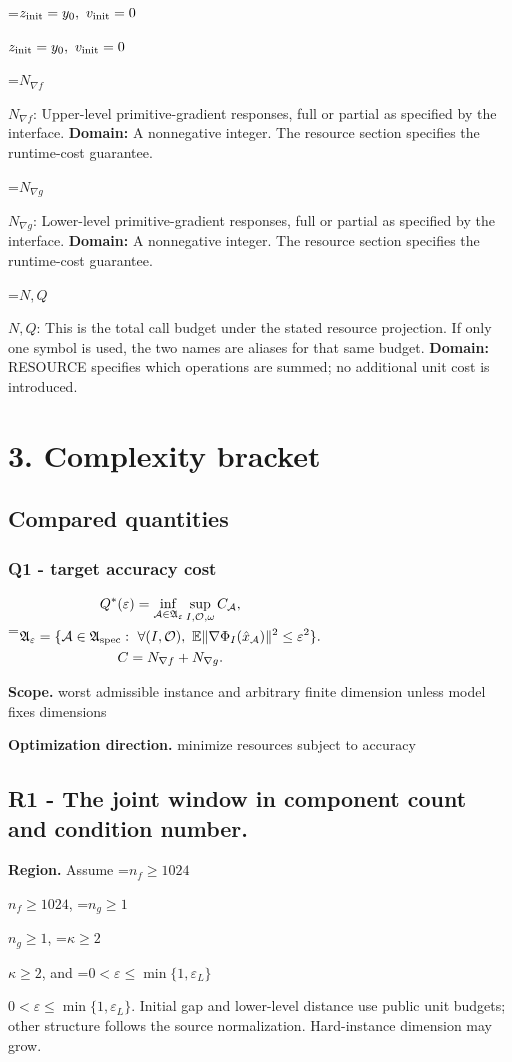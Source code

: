 \documentclass[10pt,a4paper]{article}
\newcommand{\AtlasMath}[1]{\par\begingroup\centering\setbox0=\hbox{$\displaystyle #1$}\ifdim\wd0>1.4\linewidth\typeout{ATLAS WIDE FORMULA: \the\wd0}\fi\ifdim\wd0>\linewidth\resizebox{\linewidth}{!}{\box0}\else\box0\fi\par\endgroup}
\newcommand{\AtlasInlineMath}[1]{\begingroup\setbox0=\hbox{$#1$}\ifdim\wd0>.4\linewidth\endgroup\AtlasMath{#1}\else\endgroup$#1$\fi}
\begin{document}
\AtlasInlineMath{z_{\rm init}=y_0,\ v_{\rm init}=0}

\AtlasInlineMath{N_{\nabla f}}: Upper-level primitive-gradient responses, full or partial as specified by the interface. \textbf{Domain:} A nonnegative integer. The resource section specifies the runtime-cost guarantee.

\AtlasInlineMath{N_{\nabla g}}: Lower-level primitive-gradient responses, full or partial as specified by the interface. \textbf{Domain:} A nonnegative integer. The resource section specifies the runtime-cost guarantee.

\AtlasInlineMath{N,Q}: This is the total call budget under the stated resource projection. If only one symbol is used, the two names are aliases for that same budget. \textbf{Domain:} RESOURCE specifies which operations are summed; no additional unit cost is introduced.

\section{3. Complexity bracket}
\subsection{Compared quantities}
\subsubsection{Q1 - target accuracy cost}
\AtlasMath{\begin{gathered}Q^*(\varepsilon)=\inf_{\mathcal A\in\mathfrak A_\varepsilon}\sup_{I,\mathcal O,\omega}C_{\mathcal A},\\\mathfrak A_\varepsilon=\{\mathcal A\in\mathfrak A_{\rm spec}:\ \forall(I,\mathcal O),\ \mathbb E\|\nabla\Phi_I(\hat x_{\mathcal A})\|^2\le\varepsilon^2\}.\\C=N_{\nabla f}+N_{\nabla g}.\end{gathered}}
\textbf{Scope.} worst admissible instance and arbitrary finite dimension unless model fixes dimensions

\textbf{Optimization direction.} minimize resources subject to accuracy

\subsection{R1 - The joint window in component count and condition number.}
\textbf{Region.} Assume \AtlasInlineMath{n_f\ge1024}, \AtlasInlineMath{n_g\ge1}, \AtlasInlineMath{\kappa\ge2}, and \AtlasInlineMath{0<\varepsilon\le\min\{1,\varepsilon_L\}}. Initial gap and lower-level distance use public unit budgets; other structure follows the source normalization. Hard-instance dimension may grow.
\end{document}
